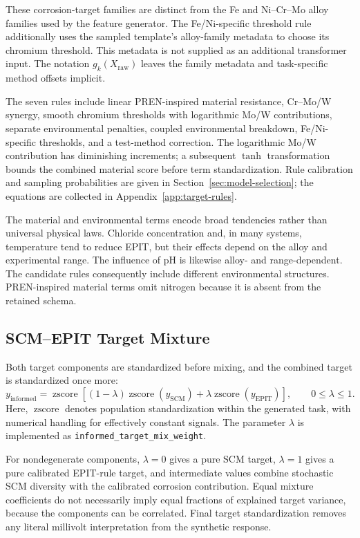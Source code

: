 \documentclass{article}
\newcommand{\zscore}{\operatorname{zscore}}
\begin{document}
These corrosion-target families are distinct from the Fe and Ni--Cr--Mo
alloy families used by the feature generator. The Fe/Ni-specific threshold
rule additionally uses the sampled template's alloy-family metadata to
choose its chromium threshold. This metadata is not supplied as an additional
transformer input. The notation \(g_k(X_{\mathrm{raw}})\) leaves the family
metadata and task-specific method offsets implicit.

The seven rules include linear PREN-inspired material resistance, Cr--Mo/W
synergy, smooth chromium thresholds with logarithmic Mo/W contributions,
separate environmental penalties, coupled environmental breakdown,
Fe/Ni-specific thresholds, and a test-method correction. The logarithmic
Mo/W contribution has diminishing increments; a subsequent \(\tanh\)
transformation bounds the combined material score before term
standardization. Rule calibration and sampling probabilities are given in
Section~\ref{sec:model-selection}; the equations are collected in
Appendix~\ref{app:target-rules}.

The material and environmental terms encode broad tendencies rather than
universal physical laws. Chloride concentration and, in many systems,
temperature tend to reduce EPIT, but their effects depend on the alloy and
experimental range. The influence of pH is likewise alloy- and range-dependent.
The candidate rules consequently include different environmental structures.
PREN-inspired material terms omit nitrogen because it is absent from the
retained schema.

\subsection{SCM--EPIT Target Mixture}
\label{sec:target-mixture}

Both target components are standardized before mixing, and the combined
target is standardized once more:
\begin{equation}
y_{\mathrm{informed}}
=\zscore\!\left[
 (1-\lambda)\zscore(y_{\mathrm{SCM}})
 +\lambda\zscore(y_{\mathrm{EPIT}})
\right],\qquad0\leq\lambda\leq1.
\label{eq:scm-epit-target}
\end{equation}
Here, \(\zscore\) denotes population standardization within the generated
task, with numerical handling for effectively constant signals. The parameter
\(\lambda\) is implemented as \texttt{informed\_target\_mix\_weight}.

For nondegenerate components, \(\lambda=0\) gives a pure SCM target,
\(\lambda=1\) gives a pure calibrated EPIT-rule target, and intermediate
values combine stochastic SCM diversity with the calibrated corrosion
contribution. Equal mixture coefficients do not necessarily imply equal
fractions of explained target variance, because the components can be
correlated. Final target standardization removes any literal millivolt
interpretation from the synthetic response.
\end{document}
